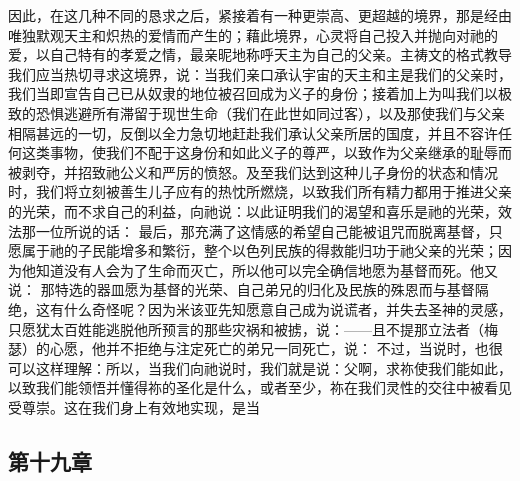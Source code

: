 因此，在这几种不同的恳求之后，紧接着有一种更崇高、更超越的境界，那是经由唯独默观天主和炽热的爱情而产生的；藉此境界，心灵将自己投入并抛向对祂的爱，以自己特有的孝爱之情，最亲昵地称呼天主为自己的父亲。主祷文的格式教导我们应当热切寻求这境界，说：当我们亲口承认宇宙的天主和主是我们的父亲时，我们当即宣告自己已从奴隶的地位被召回成为义子的身份；接着加上为叫我们以极致的恐惧逃避所有滞留于现世生命（我们在此世如同过客），以及那使我们与父亲相隔甚远的一切，反倒以全力急切地赶赴我们承认父亲所居的国度，并且不容许任何这类事物，使我们不配于这身份和如此义子的尊严，以致作为父亲继承的耻辱而被剥夺，并招致祂公义和严厉的愤怒。及至我们达到这种儿子身份的状态和情况时，我们将立刻被善生儿子应有的热忱所燃烧，以致我们所有精力都用于推进父亲的光荣，而不求自己的利益，向祂说：以此证明我们的渴望和喜乐是祂的光荣，效法那一位所说的话： 最后，那充满了这情感的希望自己能被诅咒而脱离基督，只愿属于祂的子民能增多和繁衍，整个以色列民族的得救能归功于祂父亲的光荣；因为他知道没有人会为了生命而灭亡，所以他可以完全确信地愿为基督而死。他又说： 那特选的器皿愿为基督的光荣、自己弟兄的归化及民族的殊恩而与基督隔绝，这有什么奇怪呢？因为米该亚先知愿意自己成为说谎者，并失去圣神的灵感，只愿犹太百姓能逃脱他所预言的那些灾祸和被掳，说：——且不提那立法者（梅瑟）的心愿，他并不拒绝与注定死亡的弟兄一同死亡，说： 不过，当说时，也很可以这样理解：所以，当我们向祂说时，我们就是说：父啊，求祢使我们能如此，以致我们能领悟并懂得祢的圣化是什么，或者至少，祢在我们灵性的交往中被看见受尊崇。这在我们身上有效地实现，是当\par


\subsection{第十九章}

\par

